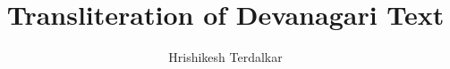 \documentclass[10pt]{article}
\title{Transliteration of Devanagari Text}
\author{Hrishikesh Terdalkar}
\begin{document}
\maketitle









\pagebreak

\nocite{*}



\end{document}
